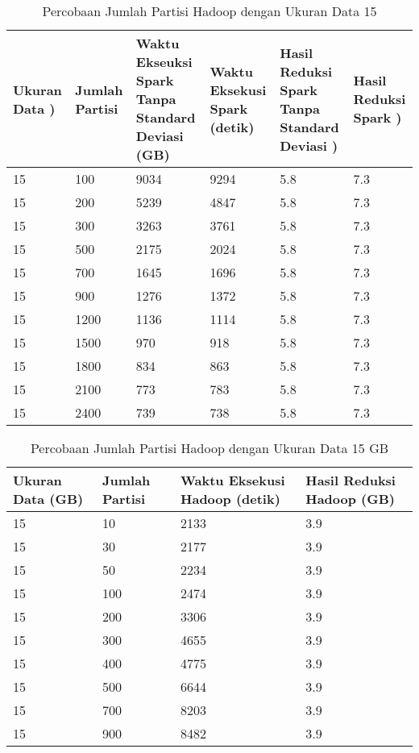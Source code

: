 \begin{table}[H] 
	\centering 
	\caption{Percobaan Jumlah Partisi Hadoop dengan Ukuran Data 15}
	\label{tab:spark7}
	\begin{tabular}{|p{1cm}|p{1cm}|p{3cm}|p{3cm}|p{3cm}|p{3cm}|}
\hline
Ukuran Data ) & Jumlah Partisi &  Waktu Ekseuksi Spark Tanpa Standard Deviasi (GB) & Waktu Eksekusi Spark (detik) & Hasil Reduksi Spark Tanpa Standard Deviasi ) & Hasil Reduksi Spark )  \\ 
\hline
15 & 100 & 9034  & 9294  &  5.8 & 7.3 \\
\hline
15 & 200 & 5239  & 4847  & 5.8 & 7.3 \\
\hline
15 & 300 & 3263  & 3761  & 5.8 & 7.3 \\
\hline
15 & 500 & 2175  & 2024  &  5.8 & 7.3 \\
\hline
15 & 700 & 1645  & 1696  & 5.8 & 7.3 \\
\hline
15 & 900 & 1276  & 1372  & 5.8 & 7.3 \\
\hline
15 & 1200 & 1136  & 1114  & 5.8 & 7.3 \\
\hline
15 & 1500 & 970  & 918  & 5.8 & 7.3 \\
\hline
15 & 1800 & 834  & 863  & 5.8 & 7.3 \\
\hline
15 & 2100 & 773  & 783  & 5.8 & 7.3 \\
\hline
15 & 2400 & 739  & 738  & 5.8 & 7.3 \\
\hline

\hline

	\end{tabular} 
\end{table}



\begin{table}[H] 
	\centering 
	\caption{Percobaan Jumlah Partisi Hadoop dengan Ukuran Data 15 GB}
	\label{tab:spark8}
	\begin{tabular}{|p{3cm}|p{3cm}|p{4cm}|p{4cm}|}
\hline
Ukuran Data (GB) & Jumlah Partisi &  Waktu Eksekusi Hadoop (detik) & Hasil Reduksi Hadoop (GB)\\
\hline
15 & 10 & 2133  & 3.9 \\
\hline
15 & 30 & 2177  & 3.9 \\
\hline
15 & 50 & 2234  & 3.9 \\
\hline
15 & 100 & 2474  & 3.9 \\
\hline
15 & 200 & 3306  & 3.9 \\
\hline
15 & 300 & 4655  & 3.9 \\
\hline
15 & 400 & 4775  & 3.9 \\
\hline
15 & 500 & 6644  & 3.9 \\
\hline
15 & 700 & 8203  & 3.9 \\
\hline
15 & 900 & 8482  & 3.9 \\
\hline


\hline

	\end{tabular} 
\end{table}


